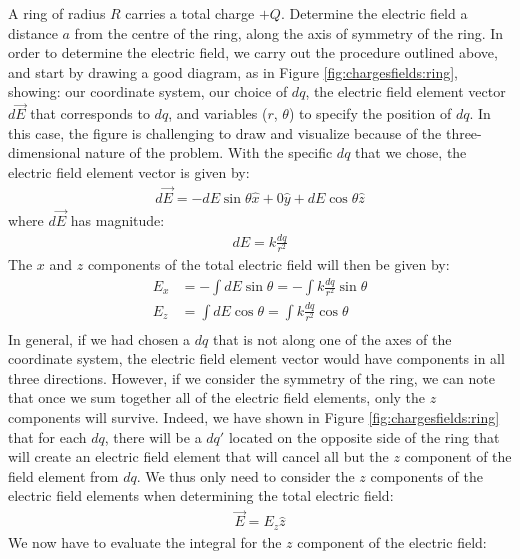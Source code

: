 \begin{example}{\label{ex:chargesfields:ring}A ring of radius $R$ carries a total charge $+Q$. Determine the electric field a distance $a$ from the centre of the ring, along the axis of symmetry of the ring.}
In order to determine the electric field, we carry out the procedure outlined above, and start by drawing a good diagram, as in Figure \ref{fig:chargesfields:ring}, showing: our coordinate system, our choice of $dq$, the electric field element vector $d\vec E$ that corresponds to $dq$, and variables ($r$, $\theta$) to specify the position of $dq$.
In this case, the figure is challenging to draw and visualize because of the three-dimensional nature of the problem. With the specific $dq$ that we chose, the electric field element vector is given by:
\begin{align*}
d\vec E = -dE\sin\theta \hat x + 0\hat y + dE\cos\theta \hat z 
\end{align*}
where $d\vec E$ has magnitude:
\begin{align*}
dE = k\frac{dq}{r^2}
\end{align*}
The $x$ and $z$ components of the total electric field will then be given by:
\begin{align*}
E_x &= -\int dE\sin\theta=-\int k\frac{dq}{r^2}\sin\theta\\
E_z &= \int dE\cos\theta=\int k\frac{dq}{r^2}\cos\theta \\
\end{align*}
In general, if we had chosen a $dq$ that is not along one of the axes of the coordinate system, the electric field element vector would have components in all three directions. However, if we consider the symmetry of the ring, we can note that once we sum together all of the electric field elements, only the $z$ components will survive. Indeed, we have shown in Figure \ref{fig:chargesfields:ring} that for each $dq$, there will be a $dq'$ located on the opposite side of the ring that will create an electric field element that will cancel all but the $z$ component of the field element from $dq$. We thus only need to consider the $z$ components of the electric field elements when determining the total electric field:
\begin{align*}
\vec E = E_z\hat z
\end{align*}
We now have to evaluate the integral for the $z$ component of the electric field:

\end{example}
